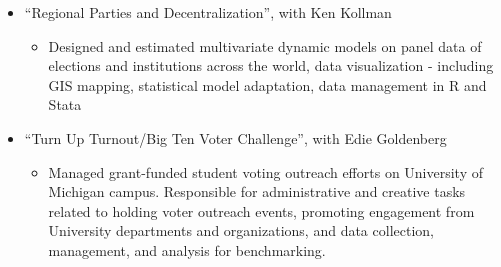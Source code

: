 \documentclass[10pt,letterpaper,unicode]{moderncv}        %
\begin{document}
{\begin{itemize}
\begin{itemize}
	\end{itemize}
	\item ``Regional Parties and Decentralization'', with Ken Kollman
	\begin{itemize}
		\item Designed and estimated multivariate dynamic models on panel data of elections and institutions across the world, data visualization - including GIS mapping, statistical model adaptation, data management in R and Stata
	\end{itemize}
	\item ``Turn Up Turnout/Big Ten Voter Challenge'', with Edie Goldenberg
	\begin{itemize}
		\item Managed grant-funded student voting outreach efforts on University of Michigan campus. Responsible for administrative and creative tasks related to holding voter outreach events, promoting engagement from University departments and organizations, and data collection, management, and analysis for benchmarking.
	\end{itemize}
\end{itemize}}
\end{document}
